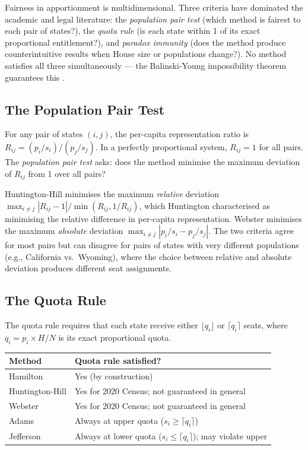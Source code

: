 \label{sec:fairness}

Fairness in apportionment is multidimensional.
Three criteria have dominated the academic and legal literature:
the \emph{population pair test} (which method is fairest to each pair
of states?), the \emph{quota rule} (is each state within 1 of its
exact proportional entitlement?), and \emph{paradox immunity}
(does the method produce counterintuitive results when House size
or populations change?).
No method satisfies all three simultaneously --- the Balinski-Young
impossibility theorem guarantees this \citep{balinski1982fair}.

\subsection{The Population Pair Test}

For any pair of states $(i,j)$, the per-capita representation ratio
is $R_{ij} = (p_i/s_i) / (p_j/s_j)$.
In a perfectly proportional system, $R_{ij} = 1$ for all pairs.
The \emph{population pair test} asks: does the method minimise
the maximum deviation of $R_{ij}$ from 1 over all pairs?

Huntington-Hill minimises the maximum \emph{relative} deviation
$\max_{i \neq j} |R_{ij} - 1|/\min(R_{ij}, 1/R_{ij})$, which Huntington
\citeyearpar{huntington1928method} characterised as minimising the
relative difference in per-capita representation.
Webster minimises the maximum \emph{absolute} deviation
$\max_{i \neq j} |p_i/s_i - p_j/s_j|$.
The two criteria agree for most pairs but can disagree for pairs of
states with very different populations (e.g., California vs.\ Wyoming),
where the choice between relative and absolute deviation produces
different seat assignments.

\subsection{The Quota Rule}

The quota rule requires that each state receive either $\lfloor q_i \rfloor$
or $\lceil q_i \rceil$ seats, where $q_i = p_i \times H / N$ is its
exact proportional quota.

\begin{center}
\begin{tabular}{ll}
\toprule
Method & Quota rule satisfied? \\
\midrule
Hamilton    & Yes (by construction) \\
Huntington-Hill & Yes for 2020 Census; not guaranteed in general \\
Webster     & Yes for 2020 Census; not guaranteed in general \\
Adams       & Always at upper quota ($s_i \geq \lceil q_i \rceil$) \\
Jefferson   & Always at lower quota ($s_i \leq \lceil q_i \rceil$); may violate upper \\
\bottomrule
\end{tabular}
\end{center}

